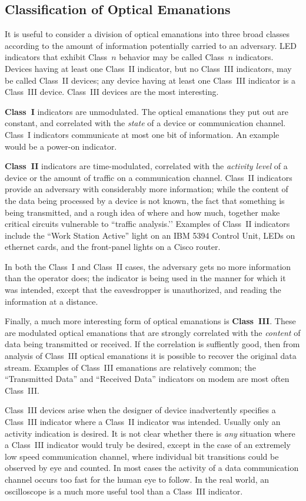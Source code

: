 \documentclass[twocolumn]{article}
\begin{document}
\subsection{Classification of Optical Emanations}

It is useful to consider a division of optical emanations into three broad classes according to the amount of information potentially carried to an adversary.  LED indicators that exhibit Class~$n$ behavior may be called Class~$n$ indicators.  Devices having at least one Class~II indicator, but no Class~III indicators, may be called Class~II devices; any device having at least one Class~III indicator is a Class~III device.  Class~III devices are the most interesting.

{\bf Class~I} indicators are unmodulated.  The optical emanations they put out are constant, and correlated with the {\it state} of a device or communication channel.  Class~I indicators communicate at most one bit of information. An example would be a power-on indicator.

{\bf Class~II} indicators are time-modulated, correlated with the {\it activity level} of a device or the amount of traffic on a communication channel.  Class~II indicators provide an adversary with considerably more information; while the content of the data being processed by a device is not known, the fact that something is being transmitted, and a rough idea of where and how much, together make critical circuits vulnerable to ``traffic analysis.’’  Examples of Class~II indicators include the ``Work Station Active'' light on an IBM 5394 Control Unit, LEDs on ethernet cards, and the front-panel lights on a Cisco router.

In both the Class~I and Class~II cases, the adversary gets no more information than the operator does; the indicator is being used in the manner for which it was intended, except that the eavesdropper is unauthorized, and reading the information at a distance.

Finally, a much more interesting form of optical emanations is {\bf Class~III}. These are modulated optical emanations that are strongly correlated with the {\it content} of data being transmitted or received.  If the correlation is suffiently good, then from analysis of Class~III optical emanations it is possible to recover the original data stream. Examples of Class~III emanations are relatively common; the ``Transmitted Data'' and ``Received Data'' indicators on modem are most often Class~III.

Class~III devices arise when the designer of device inadvertently specifies a Class~III indicator where a Class~II indicator was intended.  Usually only an activity indication is desired.  It is not clear whether there is {\it any} situation where a Class~III indicator would truly be desired, except in the case of an extremely low speed communication channel, where individual bit transitions could be observed by eye and counted.  In most cases the activity of a data communication channel occurs too fast for the human eye to follow.  In the real world, an oscilloscope is a much more useful tool than a Class~III indicator.
\end{document}
